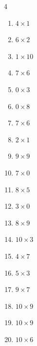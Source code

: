 \begin{multicols}{4}
\begin{enumerate}
  \item $4\times 1$
        \phantom{$=4$}

  \item $6\times 2$
        \phantom{$=12$}

  \item $1\times 10$
        \phantom{$=10$}

  \item $7\times 6$
        \phantom{$=42$}

  \item $0\times 3$
        \phantom{$=0$}

  \item $0\times 8$
        \phantom{$=0$}

  \item $7\times 6$
        \phantom{$=42$}

  \item $2\times 1$
        \phantom{$=2$}

  \item $9\times 9$
        \phantom{$=81$}

  \item $7\times 0$
        \phantom{$=0$}

  \item $8\times 5$
        \phantom{$=40$}

  \item $3\times 0$
        \phantom{$=0$}

  \item $8\times 9$
        \phantom{$=72$}

  \item $10\times 3$
        \phantom{$=30$}

  \item $4\times 7$
        \phantom{$=28$}

  \item $5\times 3$
        \phantom{$=15$}

  \item $9\times 7$
        \phantom{$=63$}

\columnbreak %

\resetques

  \item $10\times 9$
        \phantom{$=90$}

  \item $10\times 9$
        \phantom{$=90$}

  \item $10\times 6$
        \phantom{$=60$}


\end{enumerate}
\end{multicols}
